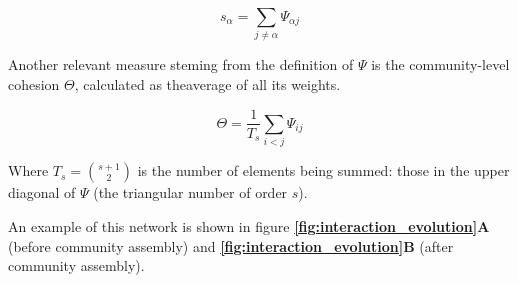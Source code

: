 \documentclass[titlepage,11pt]{article}
\begin{document}
\begin{linenumbers}
					\begin{linenomath*}
						\begin{equation}\label{eq:strength}
						s_{\alpha} = \sum_{j \neq \alpha} \Psi_{\alpha j}
						\end{equation}
					\end{linenomath*}
					\hspace{15pt}Another relevant measure steming from the definition of $ \Psi $ is the community-level cohesion $ \Theta $, calculated as theaverage of all its weights.
					\begin{linenomath*}
						\begin{equation}\label{eq:theta}
						\Theta = \frac{1}{T_s}\sum_{i < j}\Psi_{ij}
						\end{equation}
					\end{linenomath*}
					Where $T_s = {s+1 \choose 2} $ is the number of elements being summed: those in the upper diagonal of $ \Psi $ (the triangular number of order $ s $).\par
					An example of this network is shown in figure \textbf{\ref{fig:interaction_evolution}A} (before community assembly) and \textbf{\ref{fig:interaction_evolution}B} (after community assembly).

\end{linenumbers}
\end{document}
